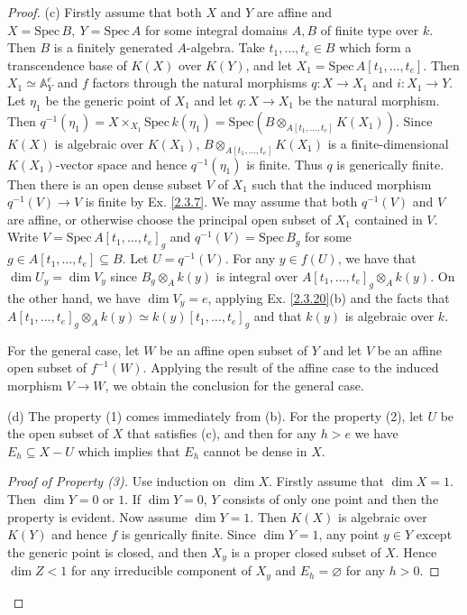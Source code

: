 \begin{proof}
	(c) Firstly assume that both $X$ and $Y$ are affine and $X=\mathrm{Spec}\,B,\ Y=\mathrm{Spec}\,A$ for some integral domains $A,B$ of finite type over $k$. Then $B$ is a finitely generated $A$-algebra. Take $t_1,\dots,t_e\in B$ which form a transcendence base of $K(X)$ over $K(Y)$, and let $X_1=\mathrm{Spec}\,A[t_1,\dots,t_e]$. Then $X_1\simeq\mathbb{A}_Y^e$ and $f$ factors through the natural morphisms $q:X\to X_1$ and $i:X_1\to Y$. Let $\eta_1$ be the generic point of $X_1$ and let $q:X\to X_1$ be the natural morphism. Then $q^{-1}(\eta_1)=X\times_{X_1}\mathrm{Spec}\,k(\eta_1)=\mathrm{Spec}(B\otimes_{A[t_1,\dots,t_e]}K(X_1))$. Since $K(X)$ is algebraic over $K(X_1)$, $B\otimes_{A[t_1,\dots,t_e]}K(X_1)$ is a finite-dimensional $K(X_1)$-vector space and hence $q^{-1}(\eta_1)$ is finite. Thus $q$ is generically finite. Then there is an open dense subset $V$ of $X_1$ such that the induced morphism $q^{-1}(V)\to V$ is finite by Ex. \ref{2.3.7}. We may assume that both $q^{-1}(V)$ and $V$ are affine, or otherwise choose the principal open subset of $X_1$ contained in $V$. Write $V=\mathrm{Spec}\,A[t_1,\dots,t_e]_g$ and $q^{-1}(V)=\mathrm{Spec}\,B_g$ for some $g\in A[t_1,\dots,t_e]\subseteq B$. Let $U=q^{-1}(V)$. For any $y\in f(U)$, we have that $\dim U_y=\dim V_y$ since $B_g\otimes_Ak(y)$ is integral over $A[t_1,\dots,t_e]_g\otimes_Ak(y)$. On the other hand, we have $\dim V_y=e$, applying Ex. \ref{2.3.20}(b) and the facts that $A[t_1,\dots,t_e]_g\otimes_Ak(y)\simeq k(y)[t_1,\dots,t_e]_g$ and that $k(y)$ is algebraic over $k$.
	
	For the general case, let $W$ be an affine open subset of $Y$ and let $V$ be an affine open subset of $f^{-1}(W)$. Applying the result of the affine case to the induced morphism $V\to W$, we obtain the conclusion for the general case.
	
	(d) The property (1) comes immediately from (b). For the property (2), let $U$ be the open subset of $X$ that satisfies (c), and then for any $h>e$ we have $E_h\subseteq X-U$ which implies that $E_h$ cannot be dense in $X$.
	\begin{proof}[Proof of Property (3)]
		Use induction on $\dim X$. Firstly assume that $\dim X=1$. Then $\dim Y=0\text{ or }1$. If $\dim Y=0$, $Y$ consists of only one point and then the property is evident. Now assume $\dim Y=1$. Then $K(X)$ is algebraic over $K(Y)$ and hence $f$ is genrically finite. Since $\dim Y=1$, any point $y\in Y$ except the generic point is closed, and then $X_y$ is a proper closed subset of $X$. Hence $\dim Z< 1$ for any irreducible component of $X_y$ and $E_h=\varnothing$ for any $h>0$.
		

\end{proof}
\end{proof}
